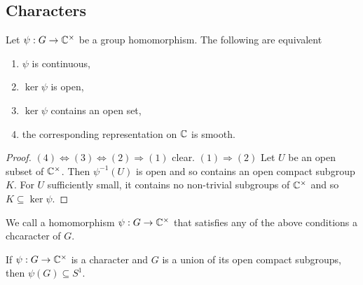 \documentclass{memoir}
\begin{document}
\subsection{Characters}
\begin{proposition}
    Let $\psi:G\to \mathbb{C}^\times$ be a group homomorphism.
    The following are equivalent
    \begin{enumerate}
        \item $\psi$ is continuous,
        \item $\ker \psi$ is open,
        \item $\ker \psi$ contains an open set,
        \item the corresponding representation on $\mathbb{C}$ is smooth.
    \end{enumerate}
\end{proposition}
\begin{proof}
    $(4)\Leftrightarrow (3) \Leftrightarrow (2) \Rightarrow (1)$ clear.
    $(1)\Rightarrow(2)$ Let $U$ be an open subset of $\mathbb{C}^\times$.
    Then $\psi^{-1}(U)$ is open and so contains an open compact subgroup $K$.
    For $U$ sufficiently small, it contains no non-trivial subgroups of $\mathbb{C}^\times$ and so $K\subseteq \ker\psi$.
\end{proof}
\begin{definition}
    We call a homomorphism $\psi:G\to \mathbb{C}^\times$ that satisfies any of the above conditions a chcaracter of $G$.
\end{definition}
\begin{proposition}
    If $\psi:G\to \mathbb{C}^\times$ is a character and $G$ is a union of its open compact subgroups, then $\psi(G)\subseteq S^1$.
\end{proposition}
\end{document}
